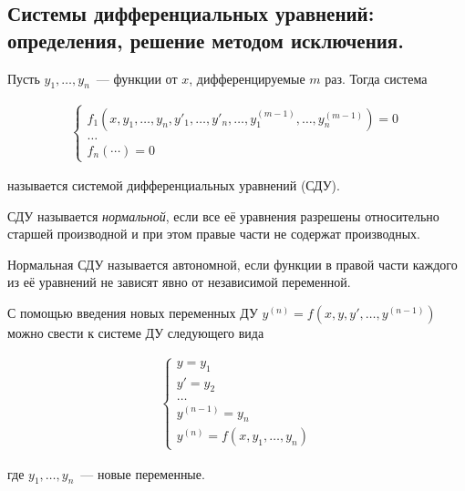 \subsection{%
  Системы дифференциальных уравнений: определения, решение методом исключения.%
}

\begin{definition}
  Пусть \(y_{1}, \dots, y_{n}\)~--- функции от \(x\), дифференцируемые \(m\)
  раз. Тогда система

  \begin{align*}
    \begin{cases}
      f_{1}(x,
        y_{1}, \dotsc, y_{n},
        y'_{1}, \dotsc, y'_{n},
        \dotsc,
        y_{1}^{(m - 1)}, \dotsc, y_{n}^{(m - 1)}
      ) = 0 \\
      \dotsc \\
      f_{n} (\cdots) = 0
    \end{cases}
  \end{align*}

  называется системой дифференциальных уравнений (СДУ).
\end{definition}

\begin{definition}
  СДУ называется \textit{нормальной}, если все её уравнения разрешены
  относительно старшей производной и при этом правые части не содержат
  производных.
\end{definition}

\begin{definition}
  Нормальная СДУ называется автономной, если функции в правой части каждого из
  её уравнений не зависят явно от независимой переменной.
\end{definition}

\begin{remark}\label{de-to-sde}
  С помощью введения новых переменных ДУ
  \(y^{(n)} = f(x, y, y', \dotsc, y^{(n - 1)})\) можно свести к системе ДУ
  следующего вида

  \begin{align*}
    \begin{cases}
      y = y_{1} \\
      y' = y_{2} \\
      \dots \\
      y^{(n - 1)} = y_{n} \\
      y^{(n)} = f(x, y_{1}, \dotsc, y_{n})
    \end{cases}
  \end{align*}

  где \(y_{1}, \dotsc, y_{n}\)~--- новые переменные.
\end{remark}

